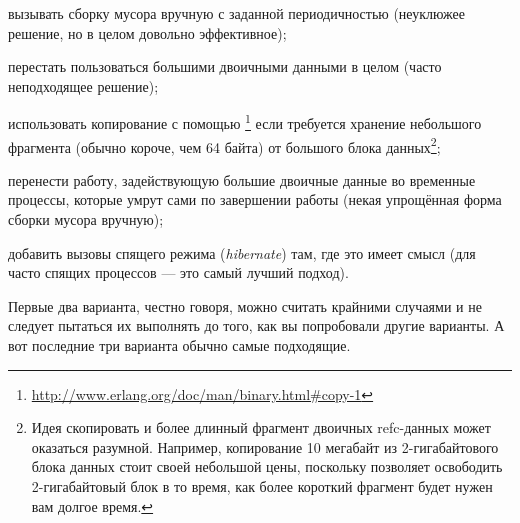\begin{itemize*}
	\item вызывать сборку мусора вручную с заданной периодичностью (неуклюжее решение, но в целом довольно эффективное);
	\item перестать пользоваться большими двоичными данными в целом (часто неподходящее решение);
	\item использовать копирование с помощью \footnote{\href{http://www.erlang.org/doc/man/binary.html\#copy-1}{http://www.erlang.org/doc/man/binary.html\#copy-1}} если требуется хранение небольшого фрагмента (обычно короче, чем 64 байта) от большого блока данных\footnote{Идея скопировать и более длинный фрагмент двоичных refc-данных может оказаться разумной. Например, копирование 10 мегабайт из 2-гигабайтового блока данных стоит своей небольшой цены, поскольку позволяет освободить 2-гигабайтовый блок в то время, как более короткий фрагмент будет нужен вам долгое время.};
	\item перенести работу, задействующую большие двоичные данные во временные процессы, которые умрут сами по завершении работы (некая упрощённая форма сборки мусора вручную);
	\item добавить вызовы спящего режима (\emph{hibernate}) там, где это имеет смысл (для часто спящих процессов --- это самый лучший подход).
\end{itemize*}

Первые два варианта, честно говоря, можно считать крайними случаями и не следует пытаться их выполнять до того, как вы попробовали другие варианты. А вот последние три варианта обычно самые подходящие.


